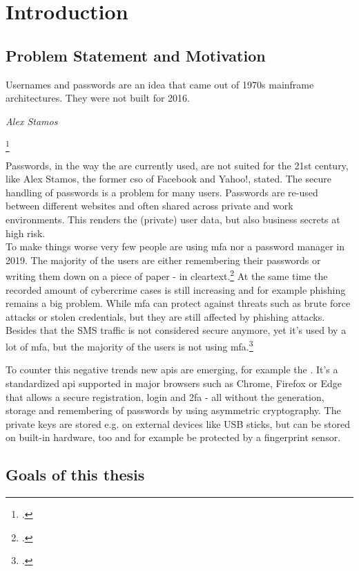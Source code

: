 \chapter{Introduction}
\label{chapter:introduction}

\section{Problem Statement and Motivation}

\setlength{}
\epigraph{\frqq Usernames and passwords are an idea that came out of 1970s mainframe architectures. They were not built for 2016.\flqq\footnotemark}{\textit{Alex Stamos}}
\footcitetext[See][]{stamos}

Passwords, in the way the are currently used, are not suited for the 21st century, like Alex Stamos, the former \gls{cso} of Facebook and Yahoo!, stated. The secure handling of passwords is a problem for many users. Passwords are re-used between different websites and often shared across private and work environments. This renders the (private) user data, but also business secrets at high risk.\\
To make things worse very few people are using \gls{mfa} nor a password manager in 2019. The majority of the users are either remembering their passwords or writing them down on a piece of paper - in cleartext.\footcites[See][]{ibm-security}[See][]{web-de-passwords}
At the same time the recorded amount of cybercrime cases is still increasing and for example phishing remains a big problem. While \gls{mfa} can protect against threats such as brute force attacks or stolen credentials, but they are still affected by phishing attacks. Besides that the SMS traffic is not considered secure anymore, yet it's used by a lot of \gls{mfa}, but the majority of the users is not using \gls{mfa}.\footcites[See][]{infratest-dimap}[See][6--7]{bka-cybercrime}

To counter this negative trends new \glspl{api} are emerging, for example the \wa. It's a standardized \gls{api} supported in major browsers such as Chrome, Firefox or Edge that allows  a secure registration, login and \gls{2fa} - all without the generation, storage and remembering of passwords by using asymmetric cryptography. The private keys are stored e.g. on external devices like USB sticks, but can be stored on built-in hardware, too and for example be protected by a fingerprint sensor.

\section{Goals of this thesis}


